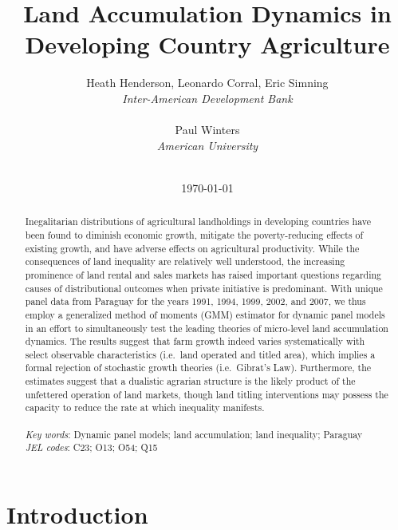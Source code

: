 \documentclass[english]{article}
\title{Land Accumulation Dynamics in Developing Country Agriculture}
\author{
Heath Henderson, Leonardo Corral, Eric Simning\\
\textit{Inter-American Development Bank} \\
\\
Paul Winters \\
\textit{American University}
\\ \\
}
\date{\today}
\begin{document}

\begin{titlepage}
\maketitle

\begin{abstract}
Inegalitarian distributions of agricultural landholdings in developing countries
have been found to diminish economic growth, mitigate the poverty-reducing
effects of existing growth, and have adverse effects on agricultural 
productivity.
While the consequences of land inequality are relatively well understood, the 
increasing prominence of land rental and sales markets has raised 
important questions regarding causes of distributional outcomes when 
private initiative is predominant.
With unique panel data from Paraguay for the years 1991, 1994, 1999, 2002, 
and 2007, we thus employ a generalized method of moments (GMM) 
estimator for dynamic panel models in an effort to simultaneously test the 
leading theories of micro-level land accumulation dynamics. 
The results suggest that farm growth indeed varies systematically with 
select observable characteristics (i.e.\ land operated and titled area), 
which implies a formal rejection of stochastic growth theories (i.e.\
Gibrat's Law). 
Furthermore, the estimates suggest that a dualistic agrarian structure is 
the likely product of the unfettered operation of land markets, though
land titling interventions may possess the capacity to reduce the rate at 
which inequality manifests. \\
\\
\textit{Key words}: Dynamic panel models; land accumulation; 
land inequality; Paraguay \\
\textit{JEL codes}:  C23; O13; O54; Q15
\end{abstract}
\thispagestyle{empty}
\end{titlepage}
\newpage


\doublespacing


\section{Introduction}
\label{sec: intro}
\end{document}
